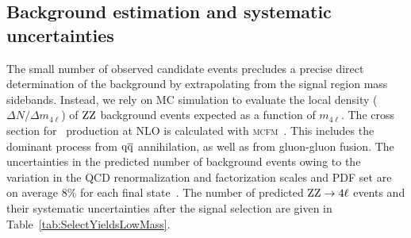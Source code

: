 \documentclass[12pt,twoside,a4paper,cmspaper,final,collab]{cms-tdr}
\begin{document}
\subsection{Background estimation and systematic uncertainties}


The small number of observed candidate events precludes a precise direct determination of the background
by extrapolating from the signal region mass sidebands.
Instead, we rely on MC simulation to evaluate the local density ($\Delta N /  \Delta m_{4\ell}$) of $\mathrm{Z}\mathrm{Z}$ background
events  expected as a function of  $m_{4\ell}$.
The cross section
for \cPZ\cPZ\ production at NLO is calculated with
\textsc{mcfm}~\cite{MCFM,Campbell:1999ah,Campbell:2011bn}.
This includes the dominant process from $\mathrm{q}\mathrm{\overline{q}}$ annihilation,  as well as from gluon-gluon fusion.
The uncertainties in the predicted number of background events owing to the variation in the QCD renormalization and factorization
scales and PDF set
are on average 8\% for each final state~\cite{Dittmaier:2012vm}.
The number of predicted $\mathrm{Z}\mathrm{Z}\rightarrow 4\ell$  events and their systematic uncertainties after the signal
selection are given in Table~\ref{tab:SelectYieldsLowMass}.
\end{document}
